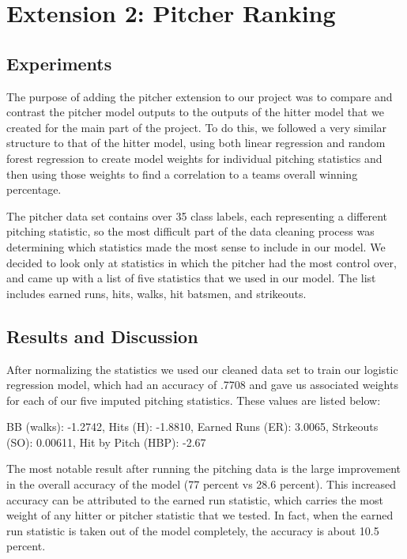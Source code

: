 \documentclass{article}
\begin{document}
\section{Extension 2: Pitcher Ranking}
\label{pitcher}

    \subsection{Experiments}
    \label{experiments3}
    
    The purpose of adding the pitcher extension to our project was to compare and contrast the pitcher model outputs to the outputs of the hitter model that we created for the main part of the project. To do this, we followed a very similar structure to that of the hitter model, using both linear regression and random forest regression to create model weights for individual pitching statistics and then using those weights to find a correlation to a teams overall winning percentage.
    
    The pitcher data set contains over 35 class labels, each representing a different pitching statistic, so the most difficult part of the data cleaning process was determining which statistics made the most sense to include in our model. We decided to look only at statistics in which the pitcher had the most control over, and came up with a list of five statistics that we used in our model. The list includes earned runs, hits, walks, hit batsmen, and strikeouts. 
    
    \subsection{Results and Discussion}
    \label{results3}
    
    After normalizing the statistics we used our cleaned data set to train our logistic regression model, which had an accuracy of .7708 and gave us associated weights for each of our five imputed pitching statistics. These values are listed below:
	
	BB (walks): -1.2742, Hits (H): -1.8810,  Earned Runs (ER): 3.0065, Strkeouts (SO): 0.00611,  Hit by Pitch (HBP): -2.67
            
    The most notable result after running the pitching data is the large improvement in the overall accuracy of the model (77 percent vs 28.6 percent). This increased accuracy can be attributed to the earned run statistic, which carries the most weight of any hitter or pitcher statistic that we tested. In fact, when the earned run statistic is taken out of the model completely, the accuracy is about 10.5 percent.
    
\end{document}
